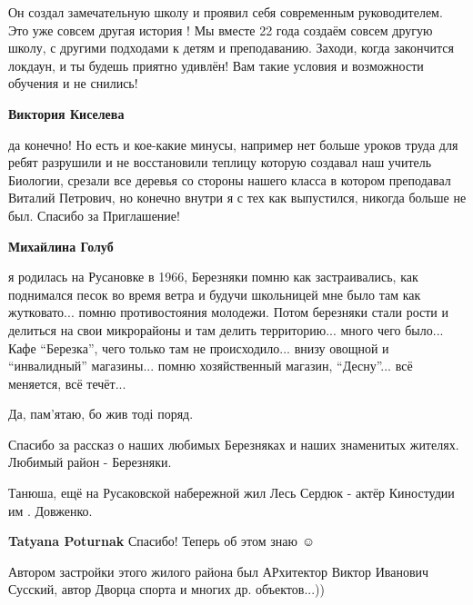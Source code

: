 \begin{itemize}
\begin{itemize}

Он создал замечательную школу и проявил себя современным руководителем. Это уже
совсем другая история ! Мы вместе 22 года создаём совсем другую школу, с
другими подходами к детям и преподаванию. Заходи, когда закончится локдаун, и
ты будешь приятно удивлён! Вам такие условия и возможности обучения и не
снились!

\begin{itemize} %
\textbf{Виктория Киселева} 

да конечно! Но есть и кое-какие минусы, например нет больше уроков труда для
ребят разрушили и не восстановили теплицу которую создавал наш учитель
Биологии, срезали все деревья со стороны нашего класса в котором преподавал
Виталий Петрович, но конечно внутри я с тех как выпустился, никогда больше не
был. Спасибо за Приглашение!

\end{itemize} %

\textbf{Михайлина Голуб} 

я родилась на Русановке в 1966, Березняки помню как застраивались, как
поднимался песок во время ветра и будучи школьницей мне было там как
жутковато... помню противостояния молодежи. Потом березняки стали рости и
делиться на свои микрорайоны и там делить территорию... много чего было... Кафе
\enquote{Березка}, чего только там не происходило... внизу овощной и \enquote{инвалидный}
магазины... помню хозяйственный магазин, \enquote{Десну}... всё меняется, всё течёт...

\end{itemize} %

Да, пам'ятаю, бо жив тоді поряд.


Спасибо за рассказ о наших любимых Березняках и наших знаменитых жителях.
Любимый район - Березняки.


Танюша, ещё на Русаковской набережной жил Лесь Сердюк - актёр Киностудии им . Довженко.

\textbf{Tatyana Poturnak} Спасибо! Теперь об этом знаю ☺ ️ 


Автором застройки этого жилого района был АРхитектор Виктор Иванович Сусский,
автор Дворца спорта и многих др. объектов...))


\end{itemize}
